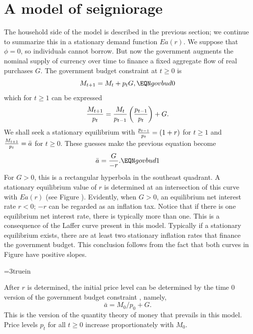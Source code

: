 \section{A model of seigniorage}

The household side of the model is described in the previous section;
we continue to summarize this in a stationary demand function $Ea(r)$.
We suppose that $\phi = 0$, so  individuals cannot borrow.
But now the government augments the nominal
supply of currency over time to finance a fixed aggregate
flow of real purchases  $G$.
The government budget constraint at $t\geq 0$ is
$$ M_{t+1} = M_t + p_t G, \EQN govbud0 $$
which for $t \geq 1$ can be expressed
$$ {M_{t+1} \over p_t} = {M_t \over p_{t-1}} \left({p_{t-1}
     \over p_t} \right) + G. $$
We shall seek a stationary  equilibrium with ${p_{t-1}\over p_t} = (1+r)$
for $t \geq 1$ and ${M_{t+1} \over p_t } = \bar a $ for
$t\geq 0$.  These guesses make the previous equation
become
$$ \bar a = {G \over -r}. \EQN govbud1 $$
For $G > 0$, this is a rectangular hyperbola in the southeast
quadrant.  A stationary equilibrium value of  $r$ is determined
at an intersection of this curve with $E a(r)$ (see Figure ).
 Evidently,
when $G > 0$, an equilibrium net interest rate
 $r <0$; $-r$ can be regarded as an inflation tax.
Notice that if there is one equilibrium net interest rate, there is typically
more than one.  This is a consequence of the Laffer curve present
in this model.
%
 Typically if a
stationary equilibrium exists,
there are at least two stationary inflation rates that finance
the government budget. This conclusion follows from the fact that
both curves in Figure  have positive slopes.


\centerline{\epsfxsize=3truein}
\caption{Two stationary equilibrium rates of return on currency that finance the
constant government deficit $G$.}
\endfigure

After $r$ is determined, the initial price level can be determined
by the time $0$ version of the government budget constraint ,
namely,
$$ \bar a = M_0/p_0 + G.   $$
This is the version of the quantity theory of money that prevails in this model.
Price levels $p_t$ for all $ t \geq 0$  increase proportionately with  $M_0$.

